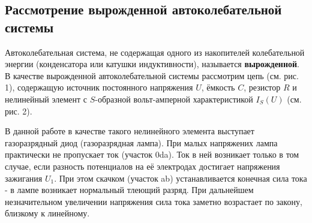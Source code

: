 \documentclass[14pt, a4paper,reqno]{article}
\begin{document}
    \subsection{Рассмотрение вырожденной автоколебательной системы}

    Автоколебательная система, не содержащая одного из накопителей колебательной энергии (конденсатора
    или катушки индуктивности), называется \textbf{вырожденной}. В качестве вырожденной автоколебательной
    системы рассмотрим цепь (см. рис. 1), содержащую источник постоянного напряжения $U$, ёмкость $C$, резистор $R$
    и нелинейный элемент с $S$-образной вольт-амперной характеристикой $I_S(U)$ (см. рис. 2).

    В данной работе в качестве такого нелинейного элемента выступает газоразрядный диод (газоразрядная лампа).
    При малых напряжених лампа практически не пропускает ток (участок 0da). Ток в ней возникает
    только в том случае, если разность потенциалов на её электродах достигает напряжения зажигания
    $U_1$. При этом скачком (участок ab) устанавливается конечная сила тока - в лампе возникает
    нормальный тлеющий разряд. При дальнейшем незначительном увеличении напряжения сила тока заметно
    возрастает по закону, близкому к линейному.
\end{document}
